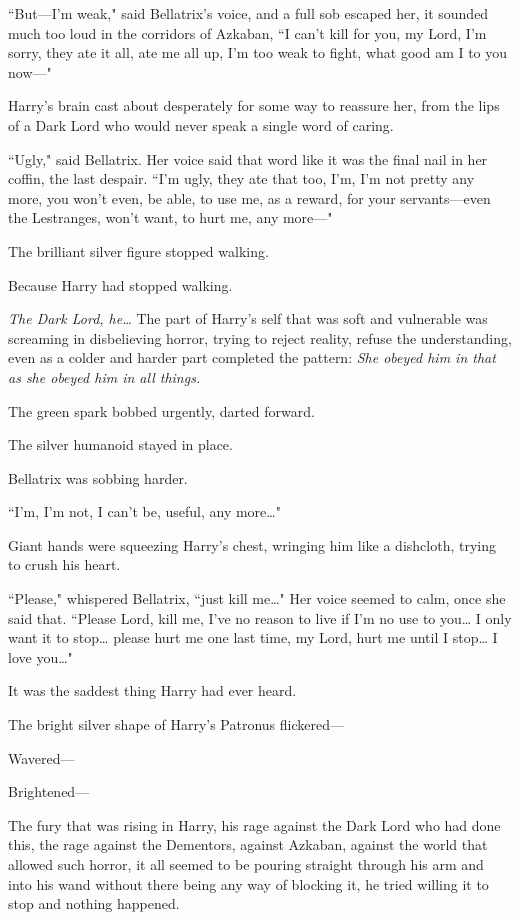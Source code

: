 ``But—I'm weak," said Bellatrix's voice, and a full sob escaped her, it sounded much too loud in the corridors of Azkaban, ``I can't kill for you, my Lord, I'm sorry, they ate it all, ate me all up, I'm too weak to fight, what good am I to you now—"

Harry's brain cast about desperately for some way to reassure her, from the lips of a Dark Lord who would never speak a single word of caring.

``Ugly," said Bellatrix. Her voice said that word like it was the final nail in her coffin, the last despair. ``I'm ugly, they ate that too, I'm, I'm not pretty any more, you won't even, be able, to use me, as a reward, for your servants—even the Lestranges, won't want, to hurt me, any more—"

The brilliant silver figure stopped walking.

Because Harry had stopped walking.

\emph{The Dark Lord, he{\ldots}} The part of Harry's self that was soft and vulnerable was screaming in disbelieving horror, trying to reject reality, refuse the understanding, even as a colder and harder part completed the pattern: \emph{She obeyed him in that as she obeyed him in all things.}

The green spark bobbed urgently, darted forward.

The silver humanoid stayed in place.

Bellatrix was sobbing harder.

``I'm, I'm not, I can't be, useful, any more{\ldots}"

Giant hands were squeezing Harry's chest, wringing him like a dishcloth, trying to crush his heart.

``Please," whispered Bellatrix, ``just kill me{\ldots}" Her voice seemed to calm, once she said that. ``Please Lord, kill me, I've no reason to live if I'm no use to you{\ldots} I only want it to stop{\ldots} please hurt me one last time, my Lord, hurt me until I stop{\ldots} I love you{\ldots}"

It was the saddest thing Harry had ever heard.

The bright silver shape of Harry's Patronus flickered—

Wavered—

Brightened—

The fury that was rising in Harry, his rage against the Dark Lord who had done this, the rage against the Dementors, against Azkaban, against the world that allowed such horror, it all seemed to be pouring straight through his arm and into his wand without there being any way of blocking it, he tried willing it to stop and nothing happened.

